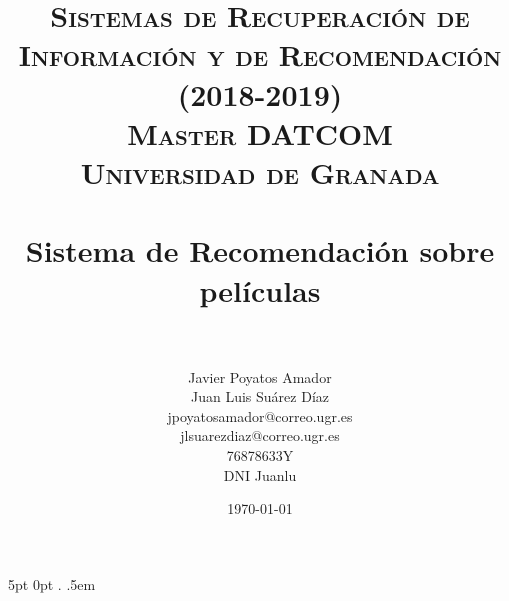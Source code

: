 
\usepackage{float}
\usepackage{hyperref}
\usepackage{url}
\usepackage[usenames]{color}
\usepackage{subfigure}

\makeatletter
\makeatother

\newcommand{\Tfrac}[2]{%
	\ooalign{%
		$\genfrac{}{}{1.2pt}1{#1}{#2}$\cr%
		$\color{white}\genfrac{}{}{.4pt}1{\phantom{#1}}{\phantom{#2}}$}%
}
\newcommand{\Dfrac}[2]{%
	\ooalign{%
		$\genfrac{}{}{1.2pt}0{#1}{#2}$\cr%
		$\color{white}\genfrac{}{}{.4pt}0{\phantom{#1}}{\phantom{#2}}$}%
}


\title{	
	\normalfont \normalsize 
	\textsc{{\bf Sistemas de Recuperación de Información y de Recomendación (2018-2019)} \\ Master DATCOM \\ Universidad de Granada} \\ [25pt] %
	\horrule{0.5pt} \\[0.4cm] %
	\huge Sistema de Recomendación sobre películas \\ %
	\horrule{2pt} \\[0.5cm] %
}

\author{Javier Poyatos Amador \\ Juan Luis Suárez Díaz \\  jpoyatosamador@correo.ugr.es \\ jlsuarezdiaz@correo.ugr.es \\ 76878633Y \\ DNI Juanlu} %

\date{\normalsize\today} %



\usepackage{amsmath, amsthm, amssymb, amsfonts, amscd} %

{5pt}                %
{0pt}                %
{}                   %
{}                   %
{\bf}                %
{.}                  %
{.5em}               %
{}                   %

